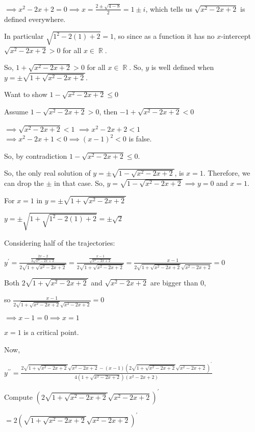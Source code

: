 \documentclass{article}
\begin{document}
$\implies x^2-2x +2 = 0 \implies x = \frac{2\pm \sqrt{4-8}}{2} = 1\pm
i$, which tells us $\sqrt{x^2-2x+2}$ is defined everywhere.

In particular $\sqrt{1^2-2(1)+2} = 1$, so since as a function it has
no $x$-intercept $\sqrt{x^2-2x+2} > 0$ for all $x \in \BbbR$.

So, $1 + \sqrt{x^2-2x+2} > 0$ for all $x \in \BbbR$. So, $y$ is well
defined when $y = \pm\sqrt{1 + \sqrt{x^2-2x+2}}$.


Want to show $1 -\sqrt{x^2-2x+2} \leq 0$

Assume $1 -\sqrt{x^2-2x+2} > 0$, then $-1 +\sqrt{x^2-2x+2} < 0$

$\implies \sqrt{x^2-2x+2} < 1$ $\implies x^2-2x+2 < 1$ $\implies
x^2-2x +1 < 0 \implies (x-1)^2 < 0$ is false.

So, by contradiction $1 -\sqrt{x^2-2x+2} \leq 0$.



So, the only real solution of $y = \pm \sqrt{1
- \sqrt{x^2-2x+2}}$, is $x = 1$. Therefore, we can drop the $\pm$ in
that case. So, $y = \sqrt{1
  - \sqrt{x^2-2x+2}} \implies y = 0$ and $x = 1$.

\newpage

For $x = 1$ in $y = \pm \sqrt{1
  + \sqrt{x^2-2x + 2}}$

$y = \pm \sqrt{1
  + \sqrt{1^2-2(1)+2}} = \pm  \sqrt{2}$


Considering half of the trajectories:

$y^\prime = \frac{\frac{2x-2}{2\sqrt{x^2-2x+2}}}{2\sqrt{1
    + \sqrt{x^2-2x+2}}} = \frac{\frac{x-1}{\sqrt{x^2-2x+2}}}{2\sqrt{1
    + \sqrt{x^2-2x+2}}} = \frac{x-1}{2\sqrt{1
    + \sqrt{x^2-2x+2}}\sqrt{x^2-2x+2}} = 0$

Both $2\sqrt{1
  + \sqrt{x^2-2x+2}}$ and $\sqrt{x^2-2x+2}$ are bigger than $0$,

so $\frac{x-1}{2\sqrt{1
    + \sqrt{x^2-2x+2}}\sqrt{x^2-2x+2}} = 0$

$ \implies x-1=0 \implies x =
1$

$x = 1$ is a critical point.

Now,

$y^{\prime\prime} = \frac{2\sqrt{1
    + \sqrt{x^2-2x+2}}\sqrt{x^2-2x+2} -(x-1)\left( 2\sqrt{1
      + \sqrt{x^2-2x+2}}\sqrt{x^2-2x+2}\right)^\prime}{4(1
  + \sqrt{x^2-2x+2})(x^2-2x+2)}$


Compute $\left( 2\sqrt{1
    + \sqrt{x^2-2x+2}}\sqrt{x^2-2x+2}\right)^\prime $

$= 2 \left(\sqrt{1
    + \sqrt{x^2-2x+2}}\sqrt{x^2-2x+2}\right)^\prime $
\end{document}
